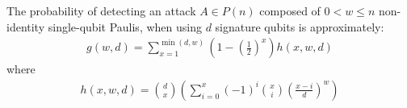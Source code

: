 \begin{theorem}
\label{theorem:probabilityOfDetectionForBlockCliffordCode}
The probability of detecting an attack $A \in P(n)$ composed of $0 < w \leq n$ non-identity single-qubit Paulis, when using $d$ signature qubits is approximately:
\begin{align}
g(w,d) = \sum_{x=1} ^{\min(d,w)} \left(1-\left(\frac{1}{2}\right)^{x}\right) h(x,w,d) \label{eq:stirlingNumberFunctionCombinedWithOtherTheorems}
\end{align}
where
\begin{align}
h(x,w,d) = {d \choose x}\left(\sum_{i=0} ^{x}(-1)^{i}{x \choose i}\left(\frac{x-i}{d}\right)^w \right) \label{eq:stirlingNumberFunction}
\end{align}
\end{theorem}
